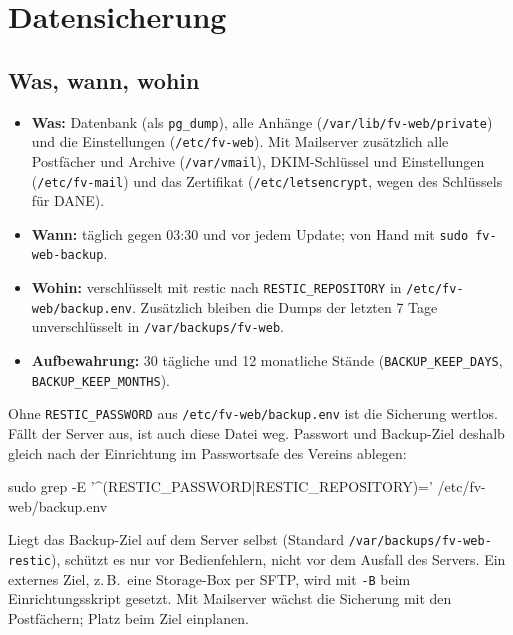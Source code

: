 \documentclass[a4paper,fontsize=10pt]{scrartcl}
\newcommand*{\cmd}[1]{\texttt{#1}}
\newcommand*{\pfad}[1]{\texttt{#1}}
\begin{document}
\section{Datensicherung}\label{sec:sicherung}

\subsection{Was, wann, wohin}

\begin{itemize}
  \item \textbf{Was:} Datenbank (als \cmd{pg\_dump}), alle Anhänge
        (\pfad{/var/lib/fv-web/private}) und die Einstellungen (\pfad{/etc/fv-web}).
        Mit Mailserver zusätzlich alle Postfächer und Archive (\pfad{/var/vmail}),
        DKIM-Schlüssel und Einstellungen (\pfad{/etc/fv-mail}) und das Zertifikat
        (\pfad{/etc/letsencrypt}, wegen des Schlüssels für DANE).
  \item \textbf{Wann:} täglich gegen 03:30 und vor jedem Update; von Hand mit
        \cmd{sudo fv-web-backup}.
  \item \textbf{Wohin:} verschlüsselt mit restic nach \cmd{RESTIC\_REPOSITORY} in
        \pfad{/etc/fv-web/backup.env}. Zusätzlich bleiben die Dumps der letzten 7 Tage
        unverschlüsselt in \pfad{/var/backups/fv-web}.
  \item \textbf{Aufbewahrung:} 30 tägliche und 12 monatliche Stände
        (\cmd{BACKUP\_KEEP\_DAYS}, \cmd{BACKUP\_KEEP\_MONTHS}).
\end{itemize}

\begin{dshinweis}[title={Wichtig: Passwort der Sicherung außerhalb des Servers aufbewahren}]
Ohne \cmd{RESTIC\_PASSWORD} aus \pfad{/etc/fv-web/backup.env} ist die Sicherung
wertlos. Fällt der Server aus, ist auch diese Datei weg. Passwort und Backup-Ziel
deshalb gleich nach der Einrichtung im Passwortsafe des Vereins ablegen:
\begin{befehl}
sudo grep -E '^(RESTIC_PASSWORD|RESTIC_REPOSITORY)=' /etc/fv-web/backup.env
\end{befehl}
\end{dshinweis}

Liegt das Backup-Ziel auf dem Server selbst (Standard \pfad{/var/backups/fv-web-restic}),
schützt es nur vor Bedienfehlern, nicht vor dem Ausfall des Servers. Ein externes Ziel,
z.\,B.\ eine Storage-Box per SFTP, wird mit \cmd{-B} beim Einrichtungsskript gesetzt.
Mit Mailserver wächst die Sicherung mit den Postfächern; Platz beim Ziel einplanen.
\end{document}
